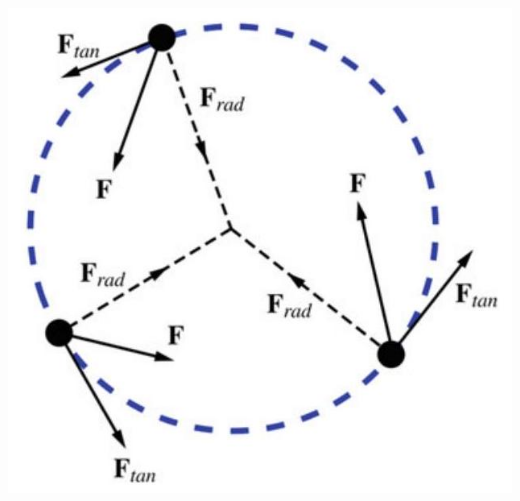 \documentclass[10pt]{article}
\begin{document}
\begin{center}
\includegraphics[max width=\textwidth]{2024_09_13_db1f357d2aad0a03eb2eg-059(3)}
\end{center}
\end{document}
